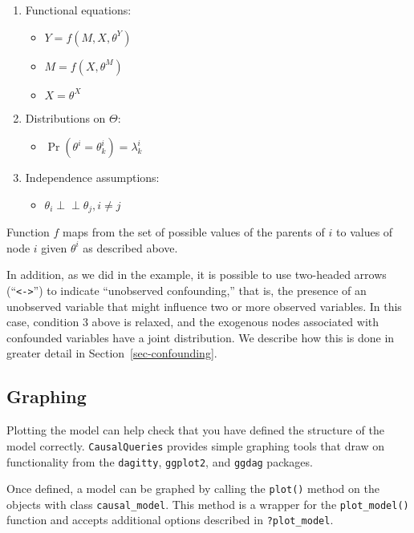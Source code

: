 \documentclass[
  11pt,
  article]{jss}
\providecommand{\tightlist}{%
  \setlength{\itemsep}{0pt}\setlength{\parskip}{0pt}}\usepackage{longtable,booktabs,array}
\begin{document}
\begin{enumerate}
\def\labelenumi{\arabic{enumi}.}
\item
  Functional equations:

  \begin{itemize}
  \tightlist
  \item
    \(Y = f(M, X, \theta^Y)\)
  \item
    \(M = f(X, \theta^M)\)
  \item
    \(X = \theta^X\)
  \end{itemize}
\item
  Distributions on \(\Theta\):

  \begin{itemize}
  \tightlist
  \item
    \(\Pr(\theta^i = \theta^i_k) = \lambda^i_k\)
  \end{itemize}
\item
  Independence assumptions:

  \begin{itemize}
  \tightlist
  \item
    \(\theta_i \perp\!\!\! \perp \theta_j, i\neq j\)
  \end{itemize}
\end{enumerate}

Function \(f\) maps from the set of possible values of the parents of
\(i\) to values of node \(i\) given \(\theta^i\) as described above.

In addition, as we did in the \citet{chickering_clinicians_1996}
example, it is possible to use two-headed arrows
(``\texttt{\textless{}-\textgreater{}}'') to indicate ``unobserved
confounding,'' that is, the presence of an unobserved variable that
might influence two or more observed variables. In this case, condition
3 above is relaxed, and the exogenous nodes associated with confounded
variables have a joint distribution. We describe how this is done in
greater detail in Section~\ref{sec-confounding}.

\subsection{Graphing}\label{graphing}

Plotting the model can help check that you have defined the structure of
the model correctly. \texttt{CausalQueries} provides simple graphing
tools that draw on functionality from the \texttt{dagitty},
\texttt{ggplot2}, and \texttt{ggdag} packages.

Once defined, a model can be graphed by calling the \texttt{plot()}
method on the objects with class \texttt{causal\_model}. This method is
a wrapper for the \texttt{plot\_model()} function and accepts additional
options described in \texttt{?plot\_model}.
\end{document}
